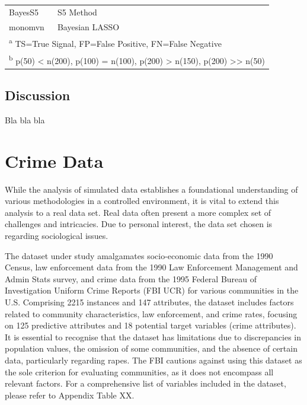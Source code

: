 \documentclass[
  11pt,
]{article}
\begin{document}
\begin{table}[!h]
\begin{tabular}[t]{>{}l|>{}l|>{}l|>{}l|>{}l|>{}l|>{}l|>{}l|>{}l|>{}l|>{}l|>{}l|>{}l|>{}l|>{}l|>{}l|>{}l|}
\hspace{1em}BayesS5 & S5 Method &  &  &  &  &  &  &  &  &  &  &  &  &  &  & \\
\hspace{1em}monomvn & Bayesian LASSO &  &  &  &  &  &  &  &  &  &  &  &  &  &  & \\
\bottomrule
\multicolumn{17}{l}{\textsuperscript{a} TS=True Signal, FP=False Positive, FN=False Negative}\\
\multicolumn{17}{l}{\textsuperscript{b} p(50) < n(200), p(100) = n(100), p(200) > n(150), p(200) >> n(50)}\\
\end{tabular}
\end{table}

\subsection{Discussion}

Bla bla bla

\newpage

\section{Crime Data}

While the analysis of simulated data establishes a foundational
understanding of various methodologies in a controlled environment, it
is vital to extend this analysis to a real data set. Real data often
present a more complex set of challenges and intricacies. Due to
personal interest, the data set chosen is regarding sociological issues.

The dataset under study amalgamates socio-economic data from the 1990
Census, law enforcement data from the 1990 Law Enforcement Management
and Admin Stats survey, and crime data from the 1995 Federal Bureau of
Investigation Uniform Crime Reports (FBI UCR) for various communities in
the U.S. Comprising 2215 instances and 147 attributes, the dataset
includes factors related to community characteristics, law enforcement,
and crime rates, focusing on 125 predictive attributes and 18 potential
target variables (crime attributes). It is essential to recognise that
the dataset has limitations due to discrepancies in population values,
the omission of some communities, and the absence of certain data,
particularly regarding rapes. The FBI cautions against using this
dataset as the sole criterion for evaluating communities, as it does not
encompass all relevant factors. For a comprehensive list of variables
included in the dataset, please refer to Appendix Table XX.
\end{document}
